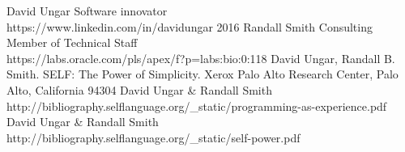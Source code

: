 \documentclass[12pt]{article}
\begin{document}
\begin{thebibliography}{9}
 David Ungar Software innovator\\ https://www.linkedin.com/in/davidungar 2016
 Randall Smith Consulting Member of Technical Staff \\ https://labs.oracle.com/pls/apex/f?p=labs:bio:0:118
 David Ungar, Randall B. Smith. SELF: The Power of Simplicity. Xerox Palo Alto Research Center, Palo Alto, California 94304
 David Ungar & Randall Smith \\ http://bibliography.selflanguage.org/_static/programming-as-experience.pdf
 David Ungar & Randall Smith \\ http://bibliography.selflanguage.org/_static/self-power.pdf
\end{thebibliography}
\end{document}
